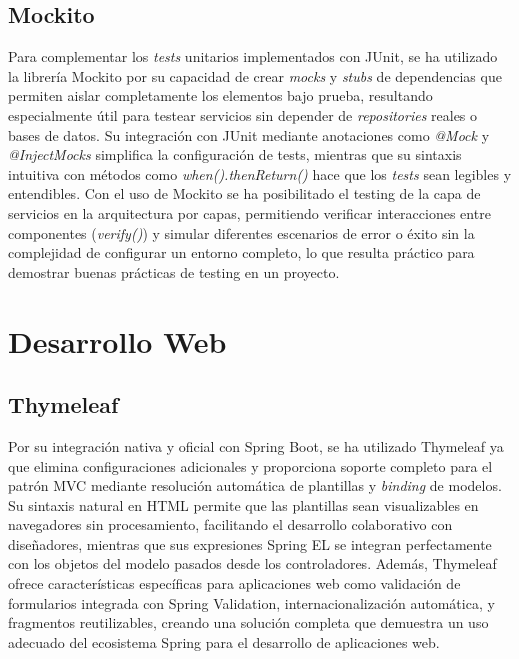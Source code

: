 \subsection{Mockito}\label{mockito}
Para complementar los \emph{tests} unitarios implementados con JUnit, se ha utilizado la librería Mockito por su capacidad de crear \emph{mocks} y \emph{stubs} de dependencias que permiten aislar completamente los elementos bajo prueba, resultando especialmente útil para testear servicios sin depender de \emph{repositories} reales o bases de datos. Su integración con JUnit mediante anotaciones como \emph{@Mock} y \emph{@InjectMocks} simplifica la configuración de tests, mientras que su sintaxis intuitiva con métodos como \emph{when().thenReturn()} hace que los \emph{tests} sean legibles y entendibles. Con el uso de Mockito se ha posibilitado el testing de la capa de servicios en la arquitectura por capas, permitiendo verificar interacciones entre componentes (\emph{verify()}) y simular diferentes escenarios de error o éxito sin la complejidad de configurar un entorno completo, lo que resulta práctico para demostrar buenas prácticas de testing en un proyecto.

\newpage

\section{Desarrollo Web}\label{desarrollo-web}

\subsection{Thymeleaf}\label{thymeleaf}
Por su integración nativa y oficial con Spring Boot, se ha utilizado Thymeleaf ya que elimina configuraciones adicionales y proporciona soporte completo para el patrón MVC mediante resolución automática de plantillas y \emph{binding} de modelos. Su sintaxis natural en HTML permite que las plantillas sean visualizables en navegadores sin procesamiento, facilitando el desarrollo colaborativo con diseñadores, mientras que sus expresiones Spring EL se integran perfectamente con los objetos del modelo pasados desde los controladores. Además, Thymeleaf ofrece características específicas para aplicaciones web como validación de formularios integrada con Spring Validation, internacionalización automática, y fragmentos reutilizables, creando una solución completa que demuestra un uso adecuado del ecosistema Spring para el desarrollo de aplicaciones web.

